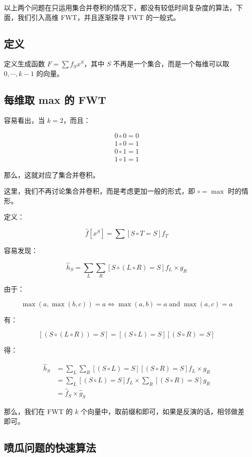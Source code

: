 \documentclass{article}
\begin{document}
以上两个问题在只运用集合并卷积的情况下，都没有较低时间复杂度的算法，下面，我们引入高维 FWT，并且逐渐探寻 FWT 的一般式。

\subsection{定义}

定义生成函数 $F=\sum f_S x^S$，其中 $S$ 不再是一个集合，而是一个每维可以取 $0,\cdots ,k-1$ 的向量。

\subsection{每维取 max 的 FWT}

容易看出，当 $k=2$，而且：

$$\begin{aligned}0 \circ 0 = 0 \\ 1 \circ 0 = 1 \\ 0 \circ 1 = 1 \\ 1 \circ 1 = 1\end{aligned}$$

那么，这就对应了集合并卷积。

这里，我们不再讨论集合并卷积，而是考虑更加一般的形式，即 $\circ = \max$ 时的情形。

定义：

$$\hat f[x^S]=\sum[S \circ T=S] f_T$$

容易发现：

$$\hat h_S=\sum_{L}\sum_{R}[S \circ (L \circ R) = S] f_L \times g_R$$

由于：

$$\max(a,\max(b,c))=a \Leftrightarrow \max(a,b)=a \operatorname{and} \max(a,c)=a$$

有：

$$[(S \circ (L \circ R))=S]=[(S \circ L) =S][(S \circ R)=S]$$

得：

$$\begin{aligned} \hat h_S &= \sum_{L} \sum_{R} [(S \circ L) =S][(S \circ R)=S] f_L \times g_R \\ &= \sum_{L} [(S \circ L)=S] f_L \times \sum_{R} [(S \circ R)=S] g_R \\ &= \hat f_S \times \hat g_S\end{aligned}$$


那么，我们在 FWT 的 $k$ 个向量中，取前缀和即可，如果是反演的话，相邻做差即可。

\subsection{喷瓜问题的快速算法}
\end{document}
